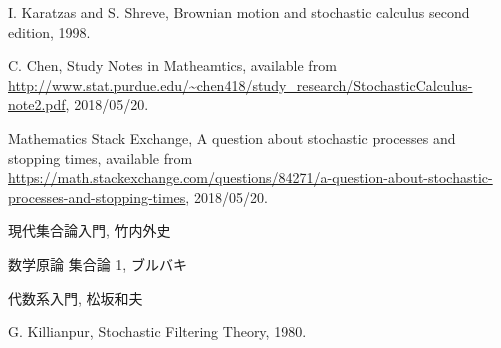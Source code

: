 \begin{thebibliography}{数字}
	 I. Karatzas and S. Shreve, Brownian motion and stochastic calculus second edition, 1998.
	
	 C. Chen, Study Notes in Matheamtics, available from \url{http://www.stat.purdue.edu/~chen418/study_research/StochasticCalculus-note2.pdf}, 2018/05/20.

	 Mathematics Stack Exchange, A question about stochastic processes and stopping times, available from \url{https://math.stackexchange.com/questions/84271/a-question-about-stochastic-processes-and-stopping-times}, 2018/05/20.
	
	 現代集合論入門, 竹内外史
	
	 数学原論 集合論 1, ブルバキ
	
	 代数系入門, 松坂和夫
	
	 G. Killianpur, Stochastic Filtering Theory, 1980. 
\end{thebibliography}